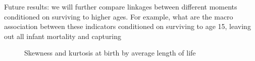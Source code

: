 \documentclass{article}
\begin{document}
Future results: we will further compare linkages between different moments conditioned on surviving to higher ages. For example, what are the macro association between these indicators conditioned on surviving to age 15, leaving out all infant mortality and capturing 

\begin{figure}
\caption{Skewness and kurtosis at birth by average length of life}
\label{fig:sk&kt}
\end{figure}

\FloatBarrier
\singlespacing

   
\end{document}

